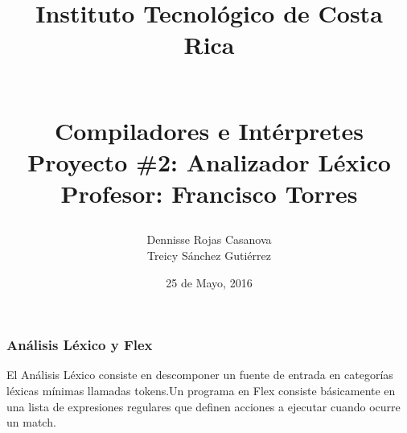 \documentclass[8, usernames, dvipsnames]{beamer}
\begin{document}
 
\title{
\begin{LARGE}
Instituto Tecnol\'ogico de Costa Rica
\end{LARGE}
\newline
\begin{Large}
\\Compiladores e Int\'erpretes
\\Proyecto \#2: Analizador L\'exico
\\Profesor: Francisco Torres
\end{Large}
}
\author{Dennisse Rojas Casanova
\\Treicy S\'anchez Guti\'errez}
\date{25 de Mayo, 2016}
\maketitle 
\begin{frame} 
\frametitle{An\'alisis L\'exico y Flex} 
El An\'alisis L\'exico consiste en descomponer un fuente de entrada en categor\'ias l\'exicas m\'inimas llamadas tokens.Un programa en Flex consiste b\'asicamente en una lista de expresiones regulares que definen acciones a ejecutar cuando ocurre un match.\end{frame} 
\end{document}

